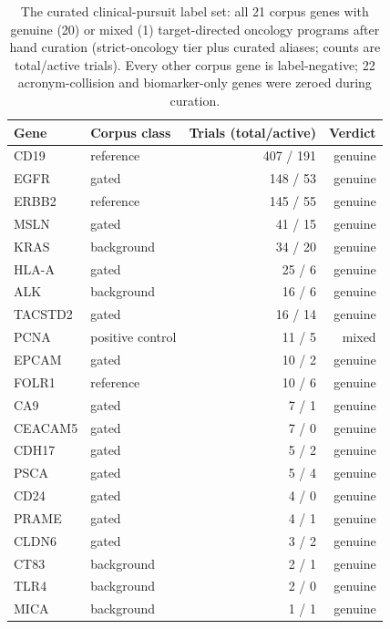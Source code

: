 \documentclass[11pt]{article}
\begin{document}
\begin{table}[t]\centering\footnotesize
\caption{The curated clinical-pursuit label set: all 21 corpus genes with
genuine (20) or mixed (1) target-directed oncology programs after hand
curation (strict-oncology tier plus curated aliases; counts are total/active
trials). Every other corpus gene is label-negative; 22 acronym-collision and
biomarker-only genes were zeroed during curation.}\label{tab:pursued}
\begin{tabular}{llrr}
\toprule
Gene & Corpus class & Trials (total/active) & Verdict \\
\midrule
CD19 & reference & 407 / 191 & genuine \\
EGFR & gated & 148 / 53 & genuine \\
ERBB2 & reference & 145 / 55 & genuine \\
MSLN & gated & 41 / 15 & genuine \\
KRAS & background & 34 / 20 & genuine \\
HLA-A & gated & 25 / 6 & genuine \\
ALK & background & 16 / 6 & genuine \\
TACSTD2 & gated & 16 / 14 & genuine \\
PCNA & positive control & 11 / 5 & mixed \\
EPCAM & gated & 10 / 2 & genuine \\
FOLR1 & reference & 10 / 6 & genuine \\
CA9 & gated & 7 / 1 & genuine \\
CEACAM5 & gated & 7 / 0 & genuine \\
CDH17 & gated & 5 / 2 & genuine \\
PSCA & gated & 5 / 4 & genuine \\
CD24 & gated & 4 / 0 & genuine \\
PRAME & gated & 4 / 1 & genuine \\
CLDN6 & gated & 3 / 2 & genuine \\
CT83 & background & 2 / 1 & genuine \\
TLR4 & background & 2 / 0 & genuine \\
MICA & background & 1 / 1 & genuine \\
\bottomrule
\end{tabular}
\end{table}
\end{document}
